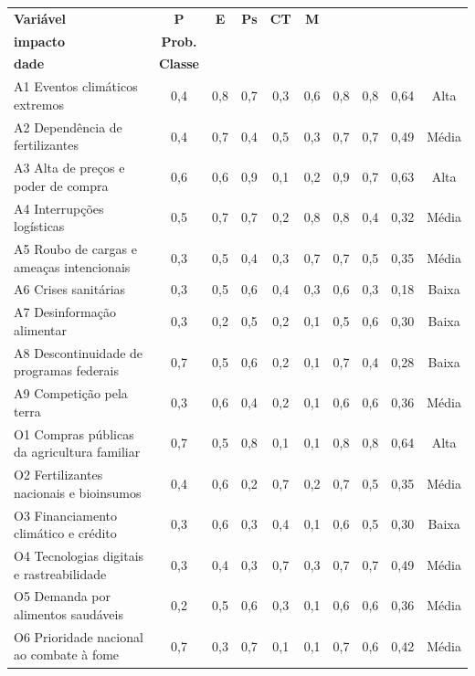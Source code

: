 \documentclass[
	12pt,				%
	openright,			%
	oneside,			%
	a4paper,			%
	chapter=TITLE,		%
	section=TITLE,		%
	english,			%
	french,				%
	spanish,			%
	brazil,				%
 ]{abntex2}
\begin{document}
\begin{quadro}[!htbp]
\centering
\caption{Análise do risco das Ameaças e das Oportunidades}
\label{qua:riscos}
\footnotesize
\renewcommand{\arraystretch}{1.0}
\setlength{\tabcolsep}{3pt}
\begin{tabularx}{\textwidth}{|>{\raggedright\arraybackslash}X|c|c|c|c|c|c|c|c|c|}
\hline
\textbf{Variável} & \textbf{P} & \textbf{E} & \textbf{Ps} & \textbf{CT} & \textbf{M} & \shortstack{\textbf{Maior}\\\textbf{impacto}} & \textbf{Prob.} & \shortstack{\textbf{Priori-}\\\textbf{dade}} & \textbf{Classe} \\
\hline
A1 Eventos climáticos extremos & 0,4 & 0,8 & 0,7 & 0,3 & 0,6 & 0,8 & 0,8 & 0,64 & Alta \\
\hline
A2 Dependência de fertilizantes & 0,4 & 0,7 & 0,4 & 0,5 & 0,3 & 0,7 & 0,7 & 0,49 & Média \\
\hline
A3 Alta de preços e poder de compra & 0,6 & 0,6 & 0,9 & 0,1 & 0,2 & 0,9 & 0,7 & 0,63 & Alta \\
\hline
A4 Interrupções logísticas & 0,5 & 0,7 & 0,7 & 0,2 & 0,8 & 0,8 & 0,4 & 0,32 & Média \\
\hline
A5 Roubo de cargas e ameaças intencionais & 0,3 & 0,5 & 0,4 & 0,3 & 0,7 & 0,7 & 0,5 & 0,35 & Média \\
\hline
A6 Crises sanitárias & 0,3 & 0,5 & 0,6 & 0,4 & 0,3 & 0,6 & 0,3 & 0,18 & Baixa \\
\hline
A7 Desinformação alimentar & 0,3 & 0,2 & 0,5 & 0,2 & 0,1 & 0,5 & 0,6 & 0,30 & Baixa \\
\hline
A8 Descontinuidade de programas federais & 0,7 & 0,5 & 0,6 & 0,2 & 0,1 & 0,7 & 0,4 & 0,28 & Baixa \\
\hline
A9 Competição pela terra & 0,3 & 0,6 & 0,4 & 0,2 & 0,1 & 0,6 & 0,6 & 0,36 & Média \\
\hline
O1 Compras públicas da agricultura familiar & 0,7 & 0,5 & 0,8 & 0,1 & 0,1 & 0,8 & 0,8 & 0,64 & Alta \\
\hline
O2 Fertilizantes nacionais e bioinsumos & 0,4 & 0,6 & 0,2 & 0,7 & 0,2 & 0,7 & 0,5 & 0,35 & Média \\
\hline
O3 Financiamento climático e crédito & 0,3 & 0,6 & 0,3 & 0,4 & 0,1 & 0,6 & 0,5 & 0,30 & Baixa \\
\hline
O4 Tecnologias digitais e rastreabilidade & 0,3 & 0,4 & 0,3 & 0,7 & 0,3 & 0,7 & 0,7 & 0,49 & Média \\
\hline
O5 Demanda por alimentos saudáveis & 0,2 & 0,5 & 0,6 & 0,3 & 0,1 & 0,6 & 0,6 & 0,36 & Média \\
\hline
O6 Prioridade nacional ao combate à fome & 0,7 & 0,3 & 0,7 & 0,1 & 0,1 & 0,7 & 0,6 & 0,42 & Média \\
\hline
\end{tabularx}
\end{quadro}
\end{document}
